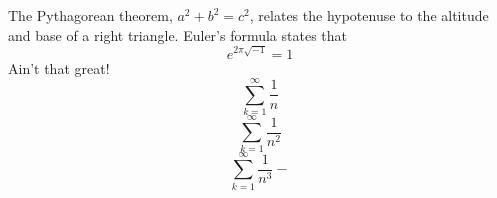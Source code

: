 The Pythagorean theorem, $a^2 + b^2 = c^2$,
relates the hypotenuse to the altitude
and base of a right triangle.
Euler’s formula states that
\[
e^{2\pi \sqrt{-1}} = 1
\]
Ain’t that great!
\begin{equation*}
\sum_{k=1}^\infty \frac{1}{n}
\end{equation*}
\begin{equation}
\label{hoho}
\sum_{k=1}^\infty \frac{1}{n^2}
\end{equation}
\begin{equation}
\sum_{k=1}^\infty \frac{1}{n^3}
-
\end{equation}
